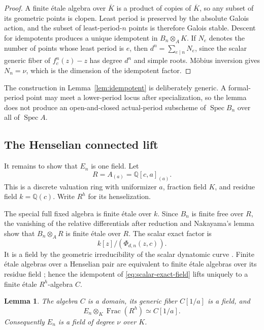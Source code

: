 \documentclass[11pt]{article}
\newtheorem{lemma}[theorem]{Lemma}
\theoremstyle{definition}
\theoremstyle{remark}
\newcommand{\Q}{\mathbb{Q}}
\newcommand{\Kbar}{\overline{K}}
\newcommand{\Spec}{\operatorname{Spec}}
\newcommand{\Frac}{\operatorname{Frac}}
\newcommand{\etale}{\'{e}tale}
\begin{document}
\begin{proof}
A finite \etale{} algebra over $\Kbar$ is a product of copies of $\Kbar$,
so any subset of its geometric points is clopen.  Least period is preserved
by the absolute Galois action, and the subset of least-period-$n$ points is
therefore Galois stable.  Descent for idempotents produces a unique
idempotent in $B_n\otimes_AK$.  If $N_e$ denotes the number of points whose
least period is $e$, then $d^n=\sum_{e\mid n}N_e$, since the scalar generic
fiber of $f_c^n(z)-z$ has degree $d^n$ and simple roots.  M\"obius inversion
gives $N_n=\nu$, which is the dimension of the idempotent factor.
\end{proof}

The construction in Lemma~\ref{lem:idempotent} is deliberately generic.  A
formal-period point may meet a lower-period locus after specialization, so
the lemma does not produce an open-and-closed actual-period subscheme of
$\Spec B_n$ over all of $\Spec A$.

\subsection{The Henselian connected lift}

It remains to show that $E_n$ is one field.  Let
\[
 R=A_{(a)}=\Q[c,a]_{(a)}.
\]
This is a discrete valuation ring with uniformizer $a$, fraction field $K$,
and residue field $k=\Q(c)$.  Write $R^h$ for its henselization.

The special full fixed algebra is finite \etale{} over $k$.  Since $B_n$ is
finite free over $R$, the vanishing of the relative differentials after
reduction and Nakayama's lemma show that $B_n\otimes_AR$ is finite \etale{}
over $R$.  The scalar exact factor is
\begin{equation}\label{eq:scalar-exact-field}
 k[z]/(\Phi_{d,n}(z,c)).
\end{equation}
It is a field by the geometric irreducibility of the scalar dynatomic curve
\citep{gao-ou-2014-dynatomic}.  Finite \etale{} algebras over a Henselian
pair are equivalent to finite \etale{} algebras over its residue field
\citep{stacks-0d49}; hence the idempotent of
\eqref{eq:scalar-exact-field} lifts uniquely to a finite \etale{}
$R^h$-algebra $C$.

\begin{lemma}\label{lem:henselian-field}
The algebra $C$ is a domain, its generic fiber $C[1/a]$ is a field, and
\[
 E_n\otimes_K\Frac(R^h)\simeq C[1/a].
\]
Consequently $E_n$ is a field of degree $\nu$ over $K$.
\end{lemma}
\end{document}
